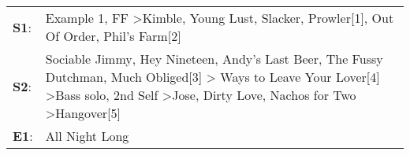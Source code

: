 \begin{supertabular}{p{0.03\textwidth}p{0.92\textwidth}}
 \textbf{S1}:  &                                                                                                                                                                                                                                                     Example 1\textsuperscript{}, \enspace FF\textsuperscript{} \textgreater \enspace Kimble\textsuperscript{}, \enspace Young Lust\textsuperscript{}, \enspace Slacker\textsuperscript{}, \enspace Prowler[1]\textsuperscript{}, \enspace Out Of Order\textsuperscript{}, \enspace Phil's Farm[2]\textsuperscript{}  \enspace  \\
 \textbf{S2}:  &  Sociable Jimmy\textsuperscript{}, \enspace Hey Nineteen\textsuperscript{}, \enspace Andy's Last Beer\textsuperscript{}, \enspace The Fussy Dutchman\textsuperscript{}, \enspace Much Obliged[3]\textsuperscript{} \textgreater {} Ways to Leave Your Lover[4]\textsuperscript{} \textgreater \enspace Bass solo\textsuperscript{}, \enspace 2nd Self\textsuperscript{} \textgreater \enspace Jose\textsuperscript{}, \enspace Dirty Love\textsuperscript{}, \enspace Nachos for Two\textsuperscript{} \textgreater \enspace Hangover[5]\textsuperscript{}  \enspace  \\
 \textbf{E1}:  &                                                                                                                                                                                                                                                                                                                                                                                                                                                                                                                                    All Night Long\textsuperscript{}  \enspace  \\
\end{supertabular}
